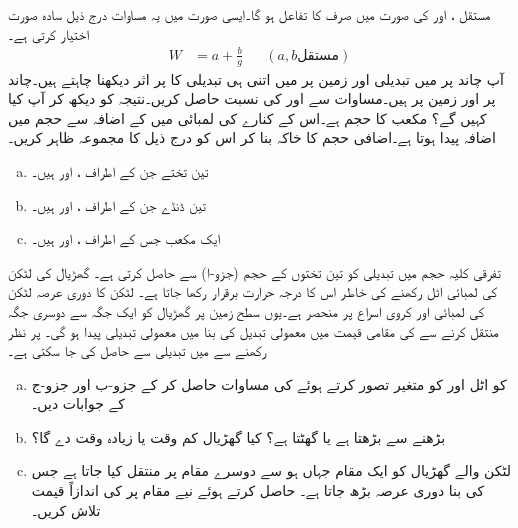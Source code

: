 مستقل ،  اور  کی صورت میں  صرف  کا تفاعل ہو گا۔ایسی صورت میں یہ مساوات درج ذیل سادہ صورت اختیار کرتی ہے۔
\begin{align}\label{مساوات_استعمال_چاند}
W&=a+\frac{b}{g}&&(a,b \text{مستقل})
\end{align}  
آپ  چاند پر  میں تبدیلی  اور زمین پر  میں اتنی ہی  تبدیلی  کا  پر  اثر  دیکھنا چاہتے ہیں۔چاند پر  اور زمین پر  ہیں۔مساوات  سے  اور  کی نسبت حاصل کریں۔نتیجہ کو دیکھ کر آپ کیا کہیں گے؟
مکعب کا حجم  ہے۔اس کے کنارے کی لمبائی میں  کے اضافہ سے حجم میں  اضافہ پیدا ہوتا ہے۔اضافی حجم  کا خاکہ بنا کر اس کو درج ذیل کا مجموعہ ظاہر کریں۔
\begin{enumerate}[a.]
\item
تین تختے جن کے اطراف ،  اور  ہیں۔
\item
تین ڈنڈے جن کے اطراف ،  اور  ہیں۔
\item
ایک مکعب جس کے اطراف ،  اور  ہیں۔
\end{enumerate} 
تفرقی کلیہ   حجم میں تبدیلی کو تین تختوں کے حجم (جزو-ا) سے حاصل کرتی ہے۔
گھڑیال کی لٹکن کی لمبائی اٹل رکھنے کی خاطر اس کا درجہ حرارت برقرار رکھا جاتا ہے۔ لٹکن کا دوری عرصہ  لٹکن کی لمبائی  اور کروی اسراع  پر منحصر ہے۔یوں سطح زمین پر گھڑیال کو ایک جگہ سے دوسری جگہ منتقل کرنے سے  کی مقامی قیمت میں معمولی تبدیل کی بنا   میں معمولی تبدیلی پیدا ہو گی۔ پر نظر رکھنے سے  میں تبدیلی  سے حاصل کی جا سکتی ہے۔
\begin{enumerate}[a.]
\item
{} کو اٹل اور  کو متغیر تصور کرتے ہوئے  کی مساوات حاصل کر کے جزو-ب اور جزو-ج کے جوابات دیں۔ 
\item
{} بڑھنے سے  بڑھتا ہے یا گھٹتا ہے؟ کیا گھڑیال کم وقت یا زیادہ وقت دے گا؟
\item
{} لٹکن والے گھڑیال کو ایک مقام جہاں  ہو سے دوسرے مقام پر منتقل کیا جاتا ہے جس کی بنا دوری عرصہ  بڑھ جاتا ہے۔ حاصل کرتے ہوئے نیے مقام پر  کی اندازاً قیمت  تلاش کریں۔
\end{enumerate}
